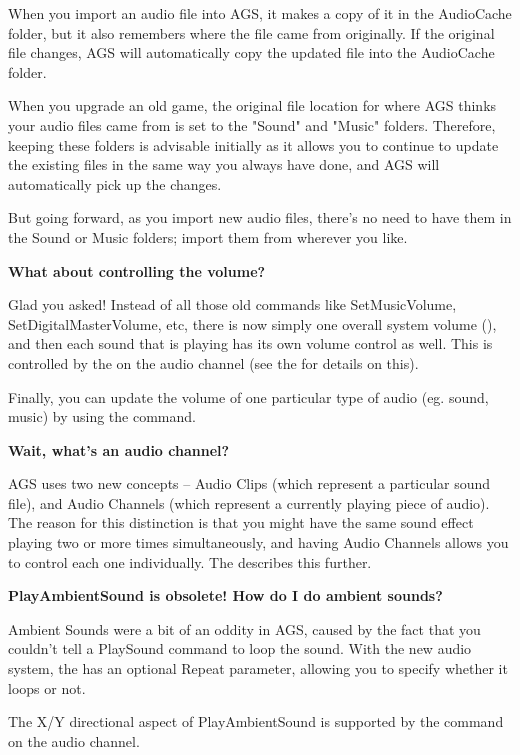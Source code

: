 When you import an audio file into AGS, it makes a copy of it in the AudioCache folder,
but it also remembers where the file came from originally. If the original file changes,
AGS will automatically copy the updated file into the AudioCache folder.

When you upgrade an old game, the original file location for where AGS thinks your audio
files came from is set to the "Sound" and "Music" folders. Therefore, keeping these folders
is advisable initially as it allows you to continue to update the existing files in the same way
you always have done, and AGS will automatically pick up the changes.

But going forward, as you import new audio files, there's no need to have them in the Sound
or Music folders; import them from wherever you like.

\bf{What about controlling the volume?}

Glad you asked! Instead of all those old commands like SetMusicVolume, SetDigitalMasterVolume,
etc, there is now simply one overall system volume (), and
then each sound that is playing has its own volume control as well. This is controlled by the
 on the audio channel (see the 
for details on this).

Finally, you can update the volume of one particular type of audio (eg. sound, music) by using
the  command.

\bf{Wait, what's an audio channel?}

AGS uses two new concepts -- Audio Clips (which represent a particular sound file), and Audio Channels
(which represent a currently playing piece of audio). The reason for this distinction is that you might
have the same sound effect playing two or more times simultaneously, and having Audio Channels allows you to
control each one individually. The  describes this further.

\bf{PlayAmbientSound is obsolete! How do I do ambient sounds?}

Ambient Sounds were a bit of an oddity in AGS, caused by the fact that you couldn't tell a PlaySound
command to loop the sound. With the new audio system, the  has
an optional Repeat parameter, allowing you to specify whether it loops or not.

The X/Y directional aspect of PlayAmbientSound is supported by the 
command on the audio channel.

